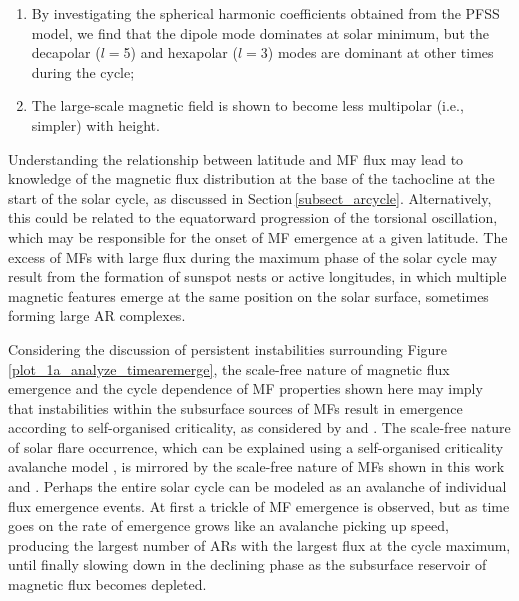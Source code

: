 \documentclass[namedreferences]{solarphysics}
\begin{document}
\begin{article}
\begin{enumerate}
\item By investigating the spherical harmonic coefficients obtained from the PFSS model, we find that the dipole mode dominates at solar minimum, but the decapolar ($l$$=$5) and hexapolar ($l$$=$3) modes are dominant at other times during the cycle;

\item The large-scale magnetic field is shown to become less multipolar (i.e., simpler) with height.
\end{enumerate}

Understanding the relationship between latitude and MF flux may lead to knowledge of the magnetic flux distribution at the base of the tachocline at the start of the solar cycle, as discussed in Section\,\ref{subsect_arcycle}. Alternatively, this could be related to the equatorward progression of the torsional oscillation, which may be responsible for the onset of MF emergence at a given latitude. The excess of MFs with large flux during the maximum phase of the solar cycle may result from the formation of sunspot nests or active longitudes, in which multiple magnetic features emerge at the same position on the solar surface, sometimes forming large AR complexes.

Considering the discussion of persistent instabilities surrounding Figure\,\ref{plot_1a_analyze_timearemerge}, the scale-free nature of magnetic flux emergence and the cycle dependence of MF properties shown here may imply that instabilities within the subsurface sources of MFs result in emergence according to self-organised criticality, as considered by \citet{Aschwanden:2011} and \citet{Abramenko:2013}. The scale-free nature of solar flare occurrence, which can be explained using a self-organised criticality avalanche model \citep[see, e.g.,][]{Lu:1991}, is mirrored by the scale-free nature of MFs shown in this work and \citet{Parnell:2009}. Perhaps the entire solar cycle can be modeled as an avalanche of individual flux emergence events. At first a trickle of MF emergence is observed, but as time goes on the rate of emergence grows like an avalanche picking up speed, producing the largest number of ARs with the largest flux at the cycle maximum, until finally slowing down in the declining phase as the subsurface reservoir of magnetic flux becomes depleted. 



\end{article}
\end{document}
